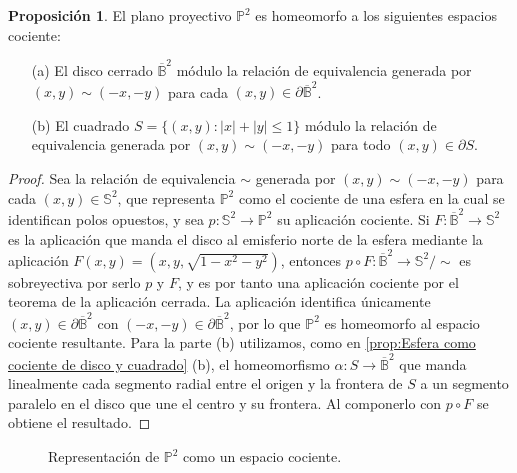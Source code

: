 \documentclass[10pt]{report}
\theoremstyle{definition}
\newtheorem{prop}[defin]{Proposición}
\begin{document}
\begin{prop}%
\label{prop:proyectivo_cociente_cuadrado}
El plano proyectivo $\mathbb{P}^2$ es homeomorfo a los siguientes espacios cociente:
\begin{itemize}
\item[(a)] El disco cerrado $\overline{\mathbb{B}}^2$ módulo la relación de equivalencia generada por $(x,y) \sim (-x,-y)$ para cada $(x,y)\in \partial \overline{\mathbb{B}}^2$.
\item[(b)] El cuadrado $S=\{(x,y):|x|+|y|\leq 1\} $ módulo la relación de equivalencia generada por $(x,y)\sim (-x,-y) $ para todo $(x,y)\in \partial S$.
\end{itemize}
\end{prop}
\begin{proof}
Sea la relación de equivalencia $\sim$ generada por $(x,y) \sim (-x,-y)$ para cada $(x,y)\in \mathbb{S}^2$, que representa $\mathbb{P}^2$ como el cociente de una esfera en la cual se identifican polos opuestos, y sea $p:\mathbb{S}^2 \to \mathbb{P}^2$ su aplicación cociente. %
Si $F:\overline{\mathbb{B}}^2 \to \mathbb{S}^2$ es la aplicación que manda el disco al emisferio norte de la esfera mediante la aplicación $F(x,y)=(x,y,\sqrt{1-x^2-y^2})$, entonces $p\circ F:\overline{\mathbb{B}}^2 \to \mathbb{S}^2/\sim$ es sobreyectiva por serlo $p$ y $F$, y es por tanto una aplicación cociente por el teorema de la aplicación cerrada. La aplicación identifica únicamente $(x,y)\in \partial \overline{\mathbb{B}}^2$ con $(-x,-y)\in \partial \overline{\mathbb{B}}^2$, por lo que $\mathbb{P}^2$ es homeomorfo al espacio cociente resultante.
Para la parte (b) utilizamos, como en \autoref{prop:Esfera como cociente de disco y cuadrado} (b), el homeomorfismo $\alpha:S\to \overline{\mathbb{B}}^2$ que manda linealmente cada segmento radial entre el origen y la frontera de $S$ a un segmento paralelo en el disco que une el centro y su frontera. Al componerlo con $p\circ F$ se obtiene el resultado.
\end{proof}


\begin{figure}[]%
\begin{center}
\caption{Representación de $\mathbb{P}^2$ como un espacio cociente.\label{fig:plano_proyectivo_cuadrado}}
\end{center}
\end{figure}
\end{document}
